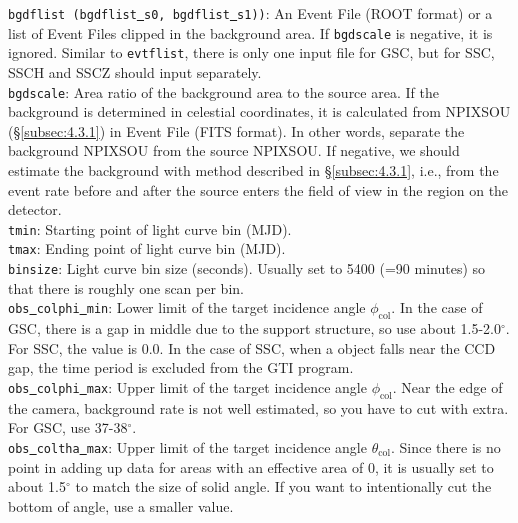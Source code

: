\documentclass[10pt]{report}
\renewcommand{\_}{\textscale{.5}{\textbf{\textunderscore}}}
\begin{document}
\noindent \texttt{bgdflist (bgdflist\underline{ }s0, bgdflist\underline{ }s1))}: An Event File (ROOT format) or a list of Event Files clipped in the background area. If \texttt{bgdscale} is negative, it is ignored. Similar to \texttt{evtflist}, there is only one input file for GSC, but for SSC, SSC\_H and SSC\_Z should input separately.\\

\noindent \texttt{bgdscale}: Area ratio of the background area to the source area. If the background is determined in celestial coordinates, it is calculated from NPIXSOU (\S\ref{subsec:4.3.1}) in Event File (FITS format). In other words, separate the background NPIXSOU from the source NPIXSOU. If negative, we should estimate the background with method described in \S\ref{subsec:4.3.1}, i.e.,  from the event rate before and after the source enters the field of view in the region on the detector. \\

\noindent \texttt{tmin}: Starting point of light curve bin (MJD). \\

\noindent \texttt{tmax}: Ending point of light curve bin (MJD). \\

\noindent \texttt{binsize}: Light curve bin size (seconds). Usually set to 5400 (=90 minutes) so that there is roughly one scan per bin. \\

\noindent \texttt{obs\underline{ }colphi\underline{ }min}: Lower limit of the target incidence angle $\phi_{\text{col}}$. In the case of GSC, there is a gap in middle due to the support structure, so use about 1.5-2.0$^{\circ}$. For SSC, the value is 0.0. In the case of SSC, when a object falls near the CCD gap, the time period is excluded from the GTI program. \\

\noindent \texttt{obs\underline{ }colphi\underline{ }max}: Upper limit of the target incidence angle $\phi_{\text{col}}$. Near the edge of the camera, background rate is not well estimated, so you have to cut with extra. For GSC, use 37-38$^{\circ}$. \\

\noindent \texttt{obs\underline{ }coltha\underline{ }max}: Upper limit of the target incidence angle $\theta_{\text{col}}$. Since there is no point in adding up data for areas with an effective area of 0, it is usually set to about 1.5$^{\circ}$ to match the size of solid angle. If you want to intentionally cut the bottom of angle, use a smaller value. \\
\end{document}
